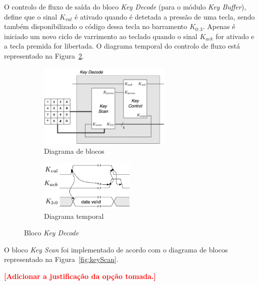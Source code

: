 \documentclass[10pt,a4paper,twocolumn]{article}
\begin{document}
O controlo de fluxo de saída do bloco \textit{Key Decode} (para o módulo \textit{Key Buffer}), define que o sinal $K_{val}$ é ativado quando é detetada a pressão de uma tecla, sendo também disponibilizado o código dessa tecla no barramento $K_{0:3}$. 
Apenas é iniciado um novo ciclo de varrimento ao teclado quando o sinal $K_{ack}$ for ativado e a tecla premida for libertada. 
O diagrama temporal do controlo de fluxo está representado na Figura~\ref{fig:keyDecode_protocol}.

\begin{figure}[!h]
\centering
\begin{subfigure}{0.5\textwidth}
	\centering
	\includegraphics[width=0.70\textwidth]{keydecode_diagram.png} 
    \caption{Diagrama de blocos}
    \label{fig:keyDecode_diagram}
\end{subfigure}
\begin{subfigure}{0.5\textwidth}
	\centering
	\includegraphics[width=0.50\textwidth]{keydecode_protocol.png} 
    \caption{Diagrama temporal}
    \label{fig:keyDecode_protocol}
\end{subfigure}
\caption{Bloco \textit{Key Decode}}
\label{fig:keyDecode}
\end{figure}

O bloco \textit{Key Scan} foi implementado de acordo com o diagrama de blocos representado na Figura~\ref{fig:keyScan}. 

\textbf{\textcolor{red}{[Adicionar a justificação da opção tomada.]}}
\end{document}
